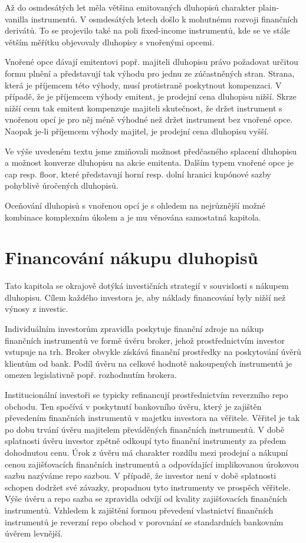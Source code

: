 \documentclass[a4paper]{book}
\begin{document}
Až do osmdesátých let měla většina emitovaných dluhopisů charakter plain-vanilla instrumentů. V osmdesátých letech došlo k mohutnému rozvoji finančních derivátů. To se projevilo také na poli fixed-income instrumentů, kde se ve stále větším měřítku objevovaly dluhopisy s vnořenými opcemi.

Vnořené opce dávají emitentovi popř. majiteli dluhopisu právo požadovat určitou formu plnění a představují tak výhodu pro jednu ze zúčastněných stran. Strana, která je příjemcem této výhody, musí protistraně poskytnout kompenzaci. V případě, že je příjemcem výhody emitent, je prodejní cena dluhopisu nižší. Skrze nižší cenu tak emitent kompenzuje majiteli skutečnost, že držet instrument s vnořenou opcí je pro něj méně výhodné než držet instrument bez vnořené opce. Naopak je-li příjemcem výhody majitel, je prodejní cena dluhopisu vyšší. 

Ve výše uvedeném textu jsme zmiňovali možnost předčasného splacení dluhopisu a možnost konverze dluhopisu na akcie emitenta. Dalším typem vnořené opce je cap resp. floor, které představují horní resp. dolní hranici kupónové sazby pohyblivě úročených dluhopisů.

Oceňování dluhopisů s vnořenou opcí je s ohledem na nejrůznější možné kombinace komplexním úkolem a je mu věnována samostatná kapitola.

\section{Financování nákupu dluhopisů}

Tato kapitola se okrajově dotýká investičních strategií v souvislosti s nákupem dluhopisu. Cílem každého investora je, aby náklady financování byly nižší než výnosy z investic.

Individuálním investorům zpravidla poskytuje finanční zdroje na nákup finančních instrumentů ve formě úvěru broker, jehož prostřednictvím investor vstupuje na trh. Broker obvykle získává finanční prostředky na poskytování úvěrů klientům od bank. Podíl úvěru na celkové hodnotě nakoupených instrumentů je omezen legislativně popř. rozhodnutím brokera.

Institucionální investoři se typicky refinancují prostřednictvím reverzního repo obchodu. Ten spočívá v poskytnutí bankovního úvěru, který je zajištěn převedením finančních instrumentů v majetku investora na věřitele. Věřitel je tak po dobu trvání úvěru majitelem převáděných finančních instrumentů. V době splatnosti úvěru investor zpětně odkoupí tyto finanční instrumenty za předem dohodnutou cenu. Úrok z úvěru má charakter rozdílu mezi prodejní a nákupní cenou zajišťovacích finančních instrumentů a odpovídající implikovanou úrokovou sazbu nazýváme repo sazbou. V případě, že investor není v době splatnosti schopen dodržet své závazky, propadnou tyto instrumenty ve prospěch věřitele. Výše úvěru a repo sazba se zpravidla odvíjí od kvality zajišťovacích finančních instrumentů. Vzhledem k zajištění formou převedení vlastnictví finančních instrumentů je reverzní repo obchod v porovnání se standardních bankovním úvěrem levnější.
\end{document}
